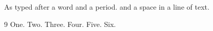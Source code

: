 \documentclass{article}
\begin{document}
As typed after a word\cite{b} and a period. \cite{c,a} and a space \cite{d} in a line of text.

\begin{thebibliography}{9}
 One.
 Two.
 Three.
 Four.
 Five.
 Six.
\end{thebibliography}
\end{document}
